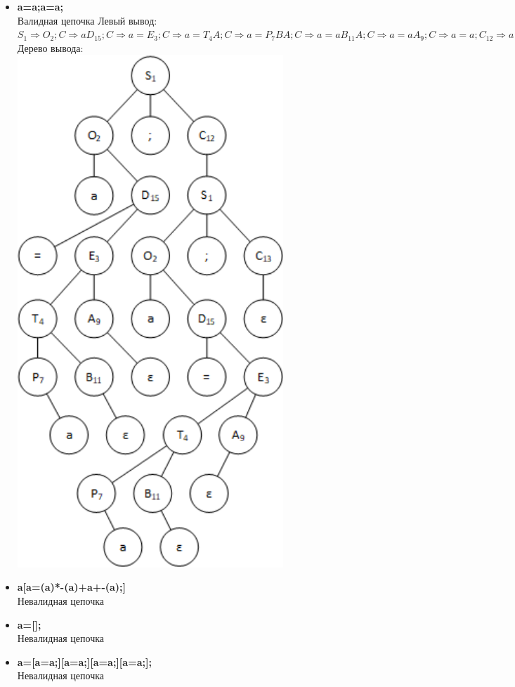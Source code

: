 \documentclass[a4paper,14pt]{extarticle}
\begin{document}
\begin{enumerate}[1.]
\begin{itemize}
    \item \textbf{a=a;a=a;}\\
        Валидная цепочка\bigbreak
        Левый вывод:\\
        $S_{1} \Rightarrow O_{2};C \Rightarrow aD_{15};C \Rightarrow a=E_{3};C \Rightarrow
        a=T_{4}A;C \Rightarrow a=P_{7}BA;C \Rightarrow a=aB_{11}A;C \Rightarrow a=aA_{9};C \Rightarrow
        a=a;C_{12} \Rightarrow a=a;S_{1} \Rightarrow a=a;O_{2};C \Rightarrow a=a;aD_{15};C \Rightarrow
        a=a;a=E;C \Rightarrow a=a;a=E_{3};C \Rightarrow a=a;a=T_{4}A;C \Rightarrow
        a=a;a=P_{7}BA;C \Rightarrow a=a;a=aB_{11}A;C \Rightarrow a=a;a=aA_{9};C \Rightarrow a=a;a=a;C_{13} \Rightarrow a=a;a=a;$
    \bigbreak
    Дерево вывода:\\
    \includegraphics[width=100mm]{task_6_3}
    \item \textbf{a[a=(a)*-(a)+a+-(a);]}\\
    Невалидная цепочка
    \item \textbf{a=[];}\\
    Невалидная цепочка
    \item \textbf{a=[a=a;][a=a;][a=a;][a=a;];}\\
    Невалидная цепочка
    \end{itemize}


\end{enumerate}
\end{document}
